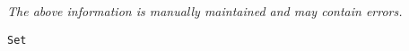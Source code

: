 \label{pkg:quickstring\_binary\_set}

{\tiny \it The above information is manually maintained and may contain errors.}
\begin{verbatim}
Set
\end{verbatim}
